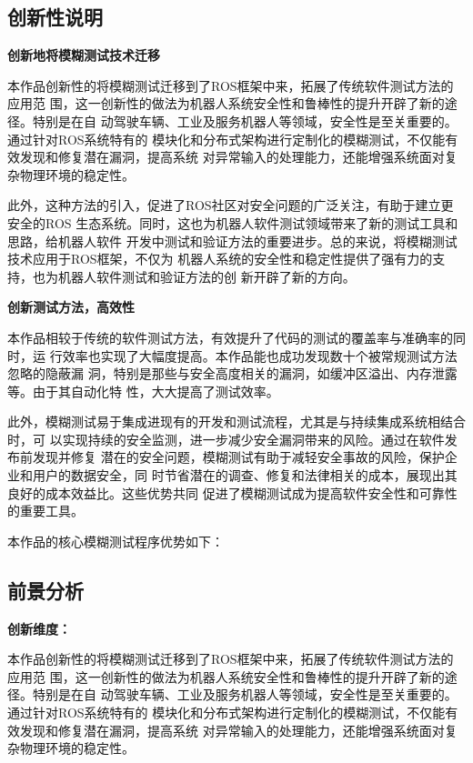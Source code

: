 \subsection{创新性说明}
\textbf{创新地将模糊测试技术迁移}
  
本作品创新性的将模糊测试迁移到了ROS框架中来，拓展了传统软件测试方法的应用范
围，这一创新性的做法为机器人系统安全性和鲁棒性的提升开辟了新的途径。特别是在自
动驾驶车辆、工业及服务机器人等领域，安全性是至关重要的。通过针对ROS系统特有的
模块化和分布式架构进行定制化的模糊测试，不仅能有效发现和修复潜在漏洞，提高系统
对异常输入的处理能力，还能增强系统面对复杂物理环境的稳定性。

此外，这种方法的引入，促进了ROS社区对安全问题的广泛关注，有助于建立更安全的ROS
生态系统。同时，这也为机器人软件测试领域带来了新的测试工具和思路，给机器人软件
开发中测试和验证方法的重要进步。总的来说，将模糊测试技术应用于ROS框架，不仅为
机器人系统的安全性和稳定性提供了强有力的支持，也为机器人软件测试和验证方法的创
新开辟了新的方向。
  
\textbf{创新测试方法，高效性}
  
本作品相较于传统的软件测试方法，有效提升了代码的测试的覆盖率与准确率的同时，运
行效率也实现了大幅度提高。本作品能也成功发现数十个被常规测试方法忽略的隐蔽漏
洞，特别是那些与安全高度相关的漏洞，如缓冲区溢出、内存泄露等。由于其自动化特
性，大大提高了测试效率。

此外，模糊测试易于集成进现有的开发和测试流程，尤其是与持续集成系统相结合时，可
以实现持续的安全监测，进一步减少安全漏洞带来的风险。通过在软件发布前发现并修复
潜在的安全问题，模糊测试有助于减轻安全事故的风险，保护企业和用户的数据安全，同
时节省潜在的调查、修复和法律相关的成本，展现出其良好的成本效益比。这些优势共同
促进了模糊测试成为提高软件安全性和可靠性的重要工具。
    

本作品的核心模糊测试程序优势如下： %


\subsection{前景分析}
\textbf{创新维度：}
  
本作品创新性的将模糊测试迁移到了ROS框架中来，拓展了传统软件测试方法的应用范
围，这一创新性的做法为机器人系统安全性和鲁棒性的提升开辟了新的途径。特别是在自
动驾驶车辆、工业及服务机器人等领域，安全性是至关重要的。通过针对ROS系统特有的
模块化和分布式架构进行定制化的模糊测试，不仅能有效发现和修复潜在漏洞，提高系统
对异常输入的处理能力，还能增强系统面对复杂物理环境的稳定性。
  
